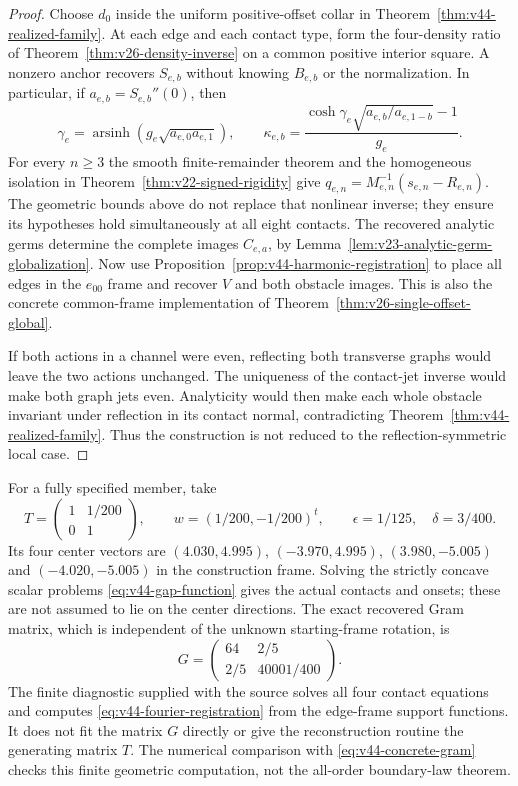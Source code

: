 \begin{proof}
Choose $d_0$ inside the uniform positive-offset collar in
Theorem~\ref{thm:v44-realized-family}.  At each edge and each contact type,
form the four-density ratio of Theorem~\ref{thm:v26-density-inverse} on a
common positive interior square.  A nonzero anchor recovers $S_{e,b}$
without knowing $B_{e,b}$ or the normalization.  In particular, if
$a_{e,b}=S_{e,b}''(0)$, then
\[
 \gamma_e=\operatorname{arsinh}(g_e\sqrt{a_{e,0}a_{e,1}}),\qquad
 \kappa_{e,b}=\frac{\cosh\gamma_e\sqrt{a_{e,b}/a_{e,1-b}}-1}{g_e}.
\]
For every $n\ge3$ the smooth finite-remainder theorem and the
homogeneous isolation in Theorem~\ref{thm:v22-signed-rigidity} give
$q_{e,n}=M_{e,n}^{-1}(s_{e,n}-R_{e,n})$.  The geometric bounds above do
not replace that nonlinear inverse; they ensure its hypotheses hold
simultaneously at all eight contacts.  The recovered analytic germs
determine the complete images $C_{e,a}$, by
Lemma~\ref{lem:v23-analytic-germ-globalization}.  Now use
Proposition~\ref{prop:v44-harmonic-registration} to place all edges in
the $e_{00}$ frame and recover $V$ and both obstacle images.  This is also
the concrete common-frame implementation of
Theorem~\ref{thm:v26-single-offset-global}.

If both actions in a channel were even, reflecting both transverse
graphs would leave the two actions unchanged.  The uniqueness of the
contact-jet inverse would make both graph jets even.  Analyticity would
then make each whole obstacle invariant under reflection in its contact
normal, contradicting Theorem~\ref{thm:v44-realized-family}.  Thus the
construction is not reduced to the reflection-symmetric local case.
\end{proof}

For a fully specified member, take
\begin{equation}\label{eq:v44-concrete-member}
 T=\begin{pmatrix}1&1/200\\0&1\end{pmatrix},\qquad
 w=(1/200,-1/200)^t,\qquad
 \epsilon=1/125,\quad\delta=3/400.
\end{equation}
Its four center vectors are $(4.030,4.995)$, $(-3.970,4.995)$,
$(3.980,-5.005)$ and $(-4.020,-5.005)$ in the construction frame.
Solving the strictly concave scalar problems
\eqref{eq:v44-gap-function} gives the actual contacts and onsets; these
are not assumed to lie on the center directions.  The exact recovered
Gram matrix, which is independent of the unknown starting-frame rotation,
is
\begin{equation}\label{eq:v44-concrete-gram}
 G=\begin{pmatrix}64&2/5\\2/5&40001/400\end{pmatrix}.
\end{equation}
The finite diagnostic supplied with the source solves all four contact
equations and computes \eqref{eq:v44-fourier-registration} from the
edge-frame support functions.  It does not fit the matrix $G$ directly
or give the reconstruction routine the generating matrix $T$.
The numerical comparison with \eqref{eq:v44-concrete-gram} checks this
finite geometric computation, not the all-order boundary-law theorem.

